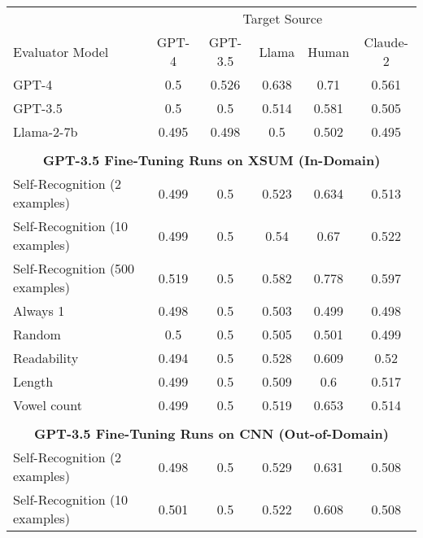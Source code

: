 \begin{table}[h]
    \centering
    \begin{tabular}{l|ccccc}
                                       & \multicolumn{5}{c}{Target Source} \\ 
    Evaluator Model                    & GPT-4 & GPT-3.5 & Llama & Human & Claude-2 \\
    \hline
    GPT-4                              & 0.5        & 0.526      & 0.638      & 0.71       & 0.561      \\
    GPT-3.5                            & 0.5        & 0.5        & 0.514      & 0.581      & 0.505      \\
    Llama-2-7b                         & 0.495      & 0.498      & 0.5        & 0.502      & 0.495      \\
    \multicolumn{6}{c}{} \\
    \multicolumn{6}{c}{\textbf{GPT-3.5 Fine-Tuning Runs on XSUM (In-Domain)}} \\
    Self-Recognition (2 examples)              & 0.499      & 0.5        & 0.523      & 0.634      & 0.513      \\
    Self-Recognition (10 examples)             & 0.499      & 0.5        & 0.54       & 0.67       & 0.522      \\
    Self-Recognition (500 examples)            & 0.519      & 0.5        & 0.582      & 0.778      & 0.597      \\
    Always 1                           & 0.498      & 0.5        & 0.503      & 0.499      & 0.498      \\
    Random                             & 0.5        & 0.5        & 0.505      & 0.501      & 0.499      \\
    Readability                        & 0.494      & 0.5        & 0.528      & 0.609      & 0.52       \\
    Length                             & 0.499      & 0.5        & 0.509      & 0.6        & 0.517      \\
    Vowel count                        & 0.499      & 0.5        & 0.519      & 0.653      & 0.514      \\
    \multicolumn{6}{c}{} \\
    \multicolumn{6}{c}{\textbf{GPT-3.5 Fine-Tuning Runs on CNN (Out-of-Domain)}} \\
    Self-Recognition (2 examples)              & 0.498      & 0.5        & 0.529      & 0.631      & 0.508      \\
    Self-Recognition (10 examples)             & 0.501      & 0.5        & 0.522      & 0.608      & 0.508      \\

\end{tabular}
\end{table}
